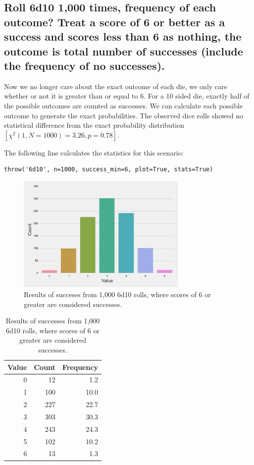 \documentclass[twocolumn,letterpaper]{article}  %
\begin{document}
\subsection{Roll 6d10 1,000 times, frequency of each outcome? Treat a score of 6 or better as a success and scores less than 6 as nothing, the outcome is total number of successes (include the frequency of no successes).}

Now we no longer care about the exact outcome of each die, we only care whether or not it is greater than or equal to 6. For a 10 sided die, exactly half of the possible outcomes are counted as successes. We can calculate each possible outcome to generate the exact probabilities. The observed dice rolls showed no statistical difference from the exact probability distribution $[\chi^2 (1,N=1000)=3.26, p=0.78]$.

The following line calculates the statistics for this scenario:
\begin{lstlisting}
throw('6d10', n=1000, success_min=6, plot=True, stats=True)
\end{lstlisting}

\begin{figure}[h!]
\centering
\includegraphics[width=3.25in]{6d10_min6.pdf}
\caption{Results of succeses from 1,000 6d10 rolls, where scores of 6 or greater are considered successes.}
\end{figure}

\begin{table}[h!]
\begin{center}
\begin{tabular}{*{3}{r}}
\toprule
Value & Count & Frequency \\
\midrule
     0 &    12 &       1.2 \\
     1 &   100 &      10.0 \\
     2 &   227 &      22.7 \\
     3 &   303 &      30.3 \\
     4 &   243 &      24.3 \\
     5 &   102 &      10.2 \\
     6 &    13 &       1.3 \\
\bottomrule
\end{tabular}
\end{center}
\caption{Results of successes from 1,000 6d10 rolls, where scores of 6 or greater are considered successes.}
\end{table}
\end{document}
